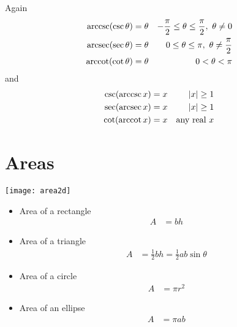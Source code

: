Again
\begin{align*}
  \arccsc(\csc \theta) &= \theta & -\frac{\pi}{2} \leq \theta \leq \frac{\pi}{2},\ \theta\ne 0 \\
  \arcsec(\sec \theta) &= \theta & 0 \leq \theta \leq \pi,\ \theta\ne \frac{\pi}{2} \\
  \arccot(\cot \theta) &= \theta & 0 < \theta < \pi	
\end{align*}
and 
\begin{align*}
  \csc(\mathop{\mathrm{arccsc}} x) &= x & |x|\ge 1 \\
  \sec(\mathop{\mathrm{arcsec}} x) &= x & |x|\ge 1 \\
  \cot(\mathop{\mathrm{arccot}} x) &= x & \text{any real $x$}
\end{align*}

\section{Areas}\label{app sec areas}
\begin{center}
 \texttt{[image: area2d]}
\end{center}
\begin{itemize}
 \item Area of a rectangle
\begin{align*}
  A &= b h
\end{align*}
 \item Area of a triangle
\begin{align*}
  A &= \frac{1}{2} b h = \frac{1}{2} ab \sin \theta
\end{align*}
 \item Area of a circle
\begin{align*}
  A &= \pi r^2
\end{align*}
 \item Area of an ellipse
\begin{align*}
  A &= \pi ab
\end{align*}
\end{itemize}

